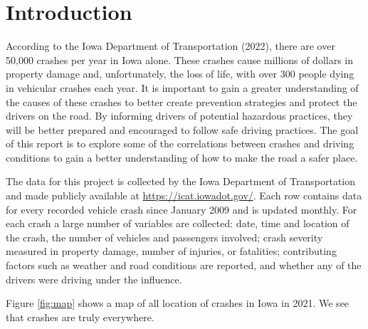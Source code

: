 \documentclass[conference,final,]{IEEEtran}
\begin{document}
\clearpage

\hypertarget{introduction}{%
\section{Introduction}\label{introduction}}

According to the Iowa Department of Transportation (2022), there are over 50,000 crashes per year in Iowa alone. These crashes cause millions of dollars in property damage and, unfortunately, the loss of life, with over 300 people dying in vehicular crashes each year. It is important to gain a greater understanding of the causes of these crashes to better create prevention strategies and protect the drivers on the road. By informing drivers of potential hazardous practices, they will be better prepared and encouraged to follow safe driving practices. The goal of this report is to explore some of the correlations between crashes and driving conditions to gain a better understanding of how to make the road a safer place.

The data for this project is collected by the Iowa Department of Transportation and made publicly available at \url{https://icat.iowadot.gov/}. Each row contains data for every recorded vehicle crash since January 2009 and is updated monthly. For each crash a large number of variables are collected: date, time and location of the crash, the number of vehicles and passengers involved; crash severity measured in property damage, number of injuries, or fatalities; contributing factors such as weather and road conditions are reported, and whether any of the drivers were driving under the influence.

Figure \ref{fig:map} shows a map of all location of crashes in Iowa in 2021. We see that crashes are truly everywhere.
\end{document}
